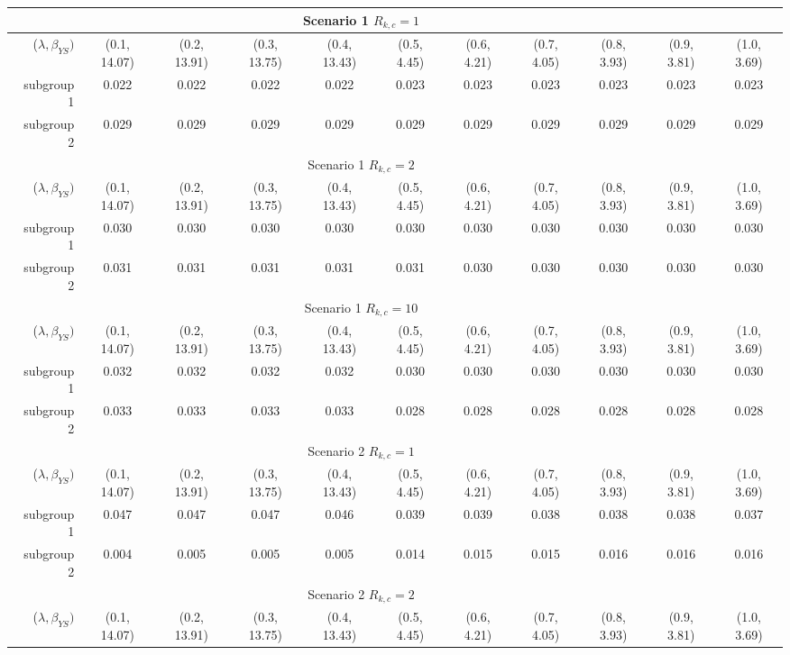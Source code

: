
\begin{tabular}{rcccc>{\columncolor[gray]{0.9}}cccccc}
\toprule 

\multicolumn{10}{c}{Scenario 1 $R_{k,c} = 1$}\\ 
\midrule 
($\lambda, \beta_{YS})$ & (0.1, 14.07)&(0.2, 13.91)&(0.3, 13.75)&(0.4, 13.43)&(0.5, 4.45)&(0.6, 4.21)&(0.7, 4.05)&(0.8, 3.93)&(0.9, 3.81)&(1.0, 3.69) \\ 
subgroup 1 &0.022 &0.022 &0.022 &0.022 &0.023 &0.023 &0.023 &0.023 &0.023 &0.023 \\ 
subgroup 2 &0.029 &0.029 &0.029 &0.029 &0.029 &0.029 &0.029 &0.029 &0.029 &0.029 \\ 
\bottomrule  
\multicolumn{10}{c}{Scenario 1 $R_{k,c} = 2$}\\ 
\midrule 
($\lambda, \beta_{YS})$ & (0.1, 14.07)&(0.2, 13.91)&(0.3, 13.75)&(0.4, 13.43)&(0.5, 4.45)&(0.6, 4.21)&(0.7, 4.05)&(0.8, 3.93)&(0.9, 3.81)&(1.0, 3.69) \\ 
subgroup 1 &0.030 &0.030 &0.030 &0.030 &0.030 &0.030 &0.030 &0.030 &0.030 &0.030 \\ 
subgroup 2 &0.031 &0.031 &0.031 &0.031 &0.031 &0.030 &0.030 &0.030 &0.030 &0.030 \\ 
\bottomrule  
\multicolumn{10}{c}{Scenario 1 $R_{k,c} = 10$}\\ 
\midrule 
($\lambda, \beta_{YS})$ & (0.1, 14.07)&(0.2, 13.91)&(0.3, 13.75)&(0.4, 13.43)&(0.5, 4.45)&(0.6, 4.21)&(0.7, 4.05)&(0.8, 3.93)&(0.9, 3.81)&(1.0, 3.69) \\ 
subgroup 1 &0.032 &0.032 &0.032 &0.032 &0.030 &0.030 &0.030 &0.030 &0.030 &0.030 \\ 
subgroup 2 &0.033 &0.033 &0.033 &0.033 &0.028 &0.028 &0.028 &0.028 &0.028 &0.028 \\ 
\bottomrule  
\multicolumn{10}{c}{Scenario 2 $R_{k,c} = 1$}\\ 
\midrule 
($\lambda, \beta_{YS})$ & (0.1, 14.07)&(0.2, 13.91)&(0.3, 13.75)&(0.4, 13.43)&(0.5, 4.45)&(0.6, 4.21)&(0.7, 4.05)&(0.8, 3.93)&(0.9, 3.81)&(1.0, 3.69) \\ 
subgroup 1 &0.047 &0.047 &0.047 &0.046 &0.039 &0.039 &0.038 &0.038 &0.038 &0.037 \\ 
subgroup 2 &0.004 &0.005 &0.005 &0.005 &0.014 &0.015 &0.015 &0.016 &0.016 &0.016 \\ 
\bottomrule  
\multicolumn{10}{c}{Scenario 2 $R_{k,c} = 2$}\\ 
\midrule 
($\lambda, \beta_{YS})$ & (0.1, 14.07)&(0.2, 13.91)&(0.3, 13.75)&(0.4, 13.43)&(0.5, 4.45)&(0.6, 4.21)&(0.7, 4.05)&(0.8, 3.93)&(0.9, 3.81)&(1.0, 3.69) \\ 

\end{tabular}
